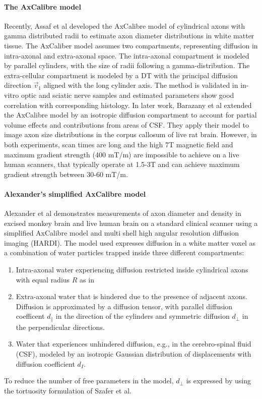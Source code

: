 \paragraph*{The AxCalibre model}
Recently, Assaf et al\cite{assaf2008} developed the AxCalibre model of cylindrical axons with gamma distributed radii to estimate axon diameter distributions in white matter tissue. The AxCaliber model assumes two compartments, representing diffusion in intra-axonal and extra-axonal space. The intra-axonal compartment is modeled by parallel cylinders, with the size of radii following a gamma-distribution. The extra-cellular compartment is modeled by a DT with the principal diffusion direction $\vec{v}_1$ aligned with the long cylinder axis. The method is validated in in-vitro optic and sciatic nerve samples and estimated parameters show good correlation with corresponding histology. In later work, Barazany et al\cite{barazany2009} extended the AxCalibre model by an isotropic diffusion compartment to account for partial volume effects and contributions from areas of CSF. They apply their model to image axon size distributions in the corpus callosum of live rat brain. However, in both experiments, scan times are long and the high 7T magnetic field and maximum gradient strength (400 mT/m) are impossible to achieve on a live human scanners, that typically operate at 1.5-3T and can achieve maximum gradient strength between 30-60 mT/m. 
\paragraph*{Alexander's simplified AxCalibre model}
Alexander et al\cite{alexander2009} demonstrates measurements of axon diameter and density in excised monkey brain and live human brain on a standard clinical scanner using a simplified AxCalibre model and multi shell high angular resolution diffusion imaging (HARDI). The model used expresses diffusion in a white matter voxel as a combination of water particles trapped inside three different compartments: 
\begin{enumerate}
  \item Intra-axonal water experiencing diffusion restricted inside cylindrical axons with equal radius $R$ as in \cite{gelderen2000}
  \item Extra-axonal water that is hindered due to the presence of adjacent axons. Diffusion is approximated by a diffusion tensor, with parallel diffusion coefficent $d_\parallel$ in the direction of the cylinders and symmetric diffusion $d_\perp$ in the perpendicular directions.
  \item Water that experiences unhindered diffusion, e.g., in the cerebro-spinal fluid (CSF), modeled by an isotropic Gaussian distribution of displacements with diffusion coefficient $d_{I}$.
\end{enumerate}
To reduce the number of free parameters in the model, $d_\perp$ is expressed by using the tortuosity formulation of Szafer et al\cite{szafer1995}.

